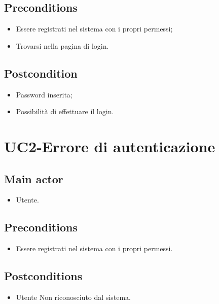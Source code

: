 \documentclass{article}
\begin{document}
     \subsection*{Preconditions} 
        \begin{itemize}
            \item Essere registrati nel sistema con i propri permessi;
            \item Trovarsi nella pagina di login.
        \end{itemize}
        \subsection*{Postcondition} 
        \begin{itemize}
            \item Password inserita;
            \item Possibilità di effettuare il login.
        \end{itemize}

\section{UC2-Errore di autenticazione}
    
     \subsection*{Main actor}
         \begin{itemize}
             \item Utente.
         \end{itemize}
     \subsection*{Preconditions} 
        \begin{itemize}
            \item Essere registrati nel sistema con i propri permessi.
        \end{itemize}
               
    \subsection*{Postconditions}
        \begin{itemize}
            \item Utente Non riconosciuto dal sistema.
        \end{itemize}
            
\end{document}
